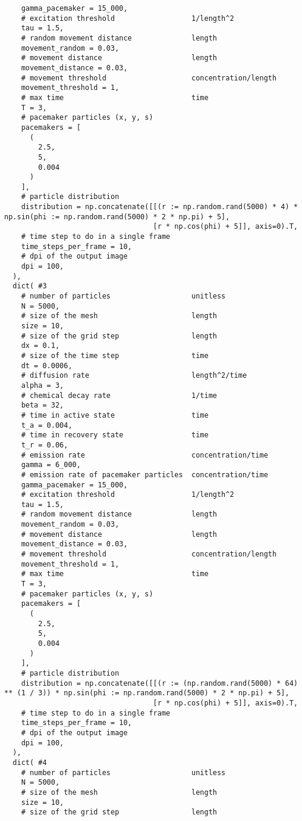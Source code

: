 \begin{verbatim}
    gamma_pacemaker = 15_000,
    # excitation threshold                  1/length^2
    tau = 1.5,
    # random movement distance              length
    movement_random = 0.03,
    # movement distance                     length
    movement_distance = 0.03,
    # movement threshold                    concentration/length
    movement_threshold = 1,
    # max time                              time
    T = 3,
    # pacemaker particles (x, y, s)
    pacemakers = [
      (
        2.5,
        5,
        0.004
      )
    ],
    # particle distribution
    distribution = np.concatenate([[(r := np.random.rand(5000) * 4) * np.sin(phi := np.random.rand(5000) * 2 * np.pi) + 5],
                                   [r * np.cos(phi) + 5]], axis=0).T,
    # time step to do in a single frame
    time_steps_per_frame = 10,
    # dpi of the output image
    dpi = 100,
  ),
  dict( #3
    # number of particles                   unitless
    N = 5000,
    # size of the mesh                      length
    size = 10,
    # size of the grid step                 length
    dx = 0.1,
    # size of the time step                 time
    dt = 0.0006,
    # diffusion rate                        length^2/time
    alpha = 3,
    # chemical decay rate                   1/time
    beta = 32,
    # time in active state                  time
    t_a = 0.004,
    # time in recovery state                time
    t_r = 0.06,
    # emission rate                         concentration/time
    gamma = 6_000,
    # emission rate of pacemaker particles  concentration/time
    gamma_pacemaker = 15_000,
    # excitation threshold                  1/length^2
    tau = 1.5,
    # random movement distance              length
    movement_random = 0.03,
    # movement distance                     length
    movement_distance = 0.03,
    # movement threshold                    concentration/length
    movement_threshold = 1,
    # max time                              time
    T = 3,
    # pacemaker particles (x, y, s)
    pacemakers = [
      (
        2.5,
        5,
        0.004
      )
    ],
    # particle distribution
    distribution = np.concatenate([[(r := (np.random.rand(5000) * 64) ** (1 / 3)) * np.sin(phi := np.random.rand(5000) * 2 * np.pi) + 5],
                                   [r * np.cos(phi) + 5]], axis=0).T,
    # time step to do in a single frame
    time_steps_per_frame = 10,
    # dpi of the output image
    dpi = 100,
  ),
  dict( #4
    # number of particles                   unitless
    N = 5000,
    # size of the mesh                      length
    size = 10,
    # size of the grid step                 length

\end{verbatim}
